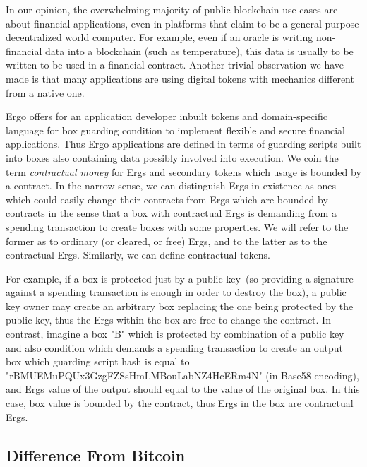  In our opinion, the overwhelming majority of public blockchain use-cases are about financial applications,
 even in platforms that claim to be a general-purpose decentralized world computer.
 For example, even if an oracle is writing
 non-financial data into a blockchain (such as temperature), this data is usually to be written to be used in a financial
 contract. Another trivial observation we have made is that many applications are using digital tokens with mechanics
 different from a native one.

 Ergo offers for an application developer inbuilt tokens and domain-specific language for box guarding
 condition to implement flexible and secure financial applications.
 Thus Ergo applications are defined in terms of guarding scripts built into boxes also containing
 data possibly involved into execution. We coin the term {\em contractual money} for Ergs and secondary tokens which
 usage is bounded by a contract. In the narrow sense, we can distinguish Ergs in existence as ones which could easily
 change their contracts from Ergs which are bounded by contracts in the sense that a box with contractual Ergs is
 demanding from a spending transaction to create boxes with some properties. We will refer to the former as to ordinary
 (or cleared, or free) Ergs, and to the latter as to the contractual Ergs. Similarly, we can define contractual tokens.

 For example, if a box is protected just by a public key~(so providing a signature against a spending transaction is
 enough in order to destroy the box), a public key owner may create an arbitrary box replacing the one being protected
 by the public key, thus the Ergs within the box are free to change the contract. In contrast, imagine a box "B" which
 is protected by combination of a public key and also condition which demands a spending transaction to create an output
 box which guarding script hash is equal to "rBMUEMuPQUx3GzgFZSsHmLMBouLabNZ4HcERm4N" (in Base58 encoding), and Ergs
 value of the output should equal to the value of the original box. In this case, box value is bounded by the contract,
 thus Ergs in the box are contractual Ergs.

\subsection{Difference From Bitcoin}


